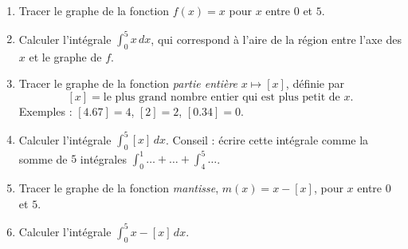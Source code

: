 \begin{exercice}\label{exoExamen-0001}
  \begin{enumerate}
  \item Tracer le graphe de la fonction $f(x)=x$ pour $x$ entre $0$ et $5$.
    \item Calculer l'intégrale $\displaystyle \int_{0}^{5} x\, dx$, qui correspond à l'aire de la région entre l'axe des $x$ et le graphe de $f$.
      \item Tracer le graphe de la fonction \emph{partie entière} $x\mapsto [x]$, définie par 
        \[[x]=\textrm{le plus grand nombre entier qui est plus petit de } x.
        \]
        Exemples : $[4.67]=4$, $[2]=2$, $[0.34]=0$.
        \item Calculer l'intégrale $\displaystyle \int_{0}^{5} [x]\, dx$. Conseil : écrire cette intégrale comme la somme de $5$ intégrales $\int_{0}^{1}\ldots+ \ldots +\int_{4}^{5}\ldots$. 
          \item Tracer le graphe de la fonction \emph{mantisse}, $m(x)=x-[x]$, pour $x$ entre $0$ et $5$.
          \item Calculer l'intégrale $\displaystyle \int_{0}^{5} x-[x]\, dx$.
  \end{enumerate}
\end{exercice}
